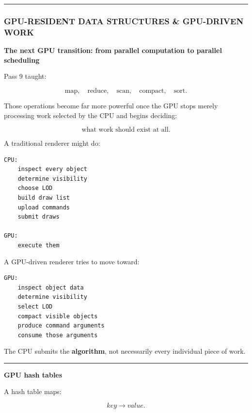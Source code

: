\begin{center}\rule{0.5\linewidth}{0.5pt}\end{center}

\subsubsection{GPU-RESIDENT DATA STRUCTURES \& GPU-DRIVEN WORK}\label{05-engine-i-ch019-gpu-resident-data-structures-gpu-driven-work}

\hypertarget{05-engine-i-ch019-gpu-resident-data-structures-gpu-driven-work}{}

\textbf{The next GPU transition: from parallel computation to parallel scheduling}

Pass 9 taught:

\[
\text{map},
\quad
\text{reduce},
\quad
\text{scan},
\quad
\text{compact},
\quad
\text{sort}.
\]

Those operations become far more powerful once the GPU stops merely processing work selected by the CPU and begins deciding:

\[
\boxed{
\text{what work should exist at all}.
}
\]

A traditional renderer might do:

\protect{}\label{p10-cpu-driven}%
\begin{verbatim}
CPU:
    inspect every object
    determine visibility
    choose LOD
    build draw list
    upload commands
    submit draws

GPU:
    execute them
\end{verbatim}

A GPU-driven renderer tries to move toward:

\protect{}\label{p10-gpu-driven}%
\begin{verbatim}
GPU:
    inspect object data
    determine visibility
    select LOD
    compact visible objects
    produce command arguments
    consume those arguments
\end{verbatim}

The CPU submits the \textbf{algorithm}, not necessarily every individual piece of work.

\begin{center}\rule{0.5\linewidth}{0.5pt}\end{center}

\textbf{GPU hash tables}

A hash table maps:

\[
key\rightarrow value.
\]


